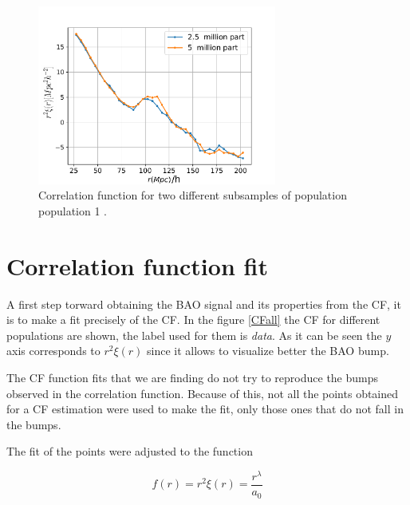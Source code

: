 \begin{figure}[htbp]
       \centering
               \includegraphics[width=0.7\textwidth]{Images/chapter4/CF_1e11_NofP.pdf}
       \caption{\small Correlation function for two different subsamples of population 
       population 1 .}
       \label{NofP}
 \end{figure}



\section{ Correlation function fit }

A first step torward obtaining the BAO signal and its properties from the CF,
it is to make a fit precisely of the CF. In the figure \ref{CFall} the CF 
for different populations are shown, the label used for them is \textit{data}. 
As it can be seen the $y$ axis corresponds to $r^2\xi(r)$ since it allows to visualize better the BAO bump.

The CF function fits that we are finding do not try to reproduce 
the bumps observed in the correlation function. Because of this, not all 
the points obtained for a CF estimation were used to make the fit, only
those ones that do not fall in the bumps. 

The fit of the points were adjusted to the function 

\begin{equation}
f(r) = r^2\xi(r) = \frac{r^\lambda}{a_0}
\label{CF_r2}
\end{equation}

